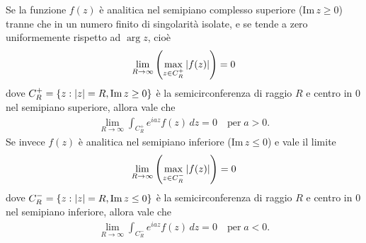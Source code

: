 \begin{lemma}[ di Jordan ]
  Se la funzione $ f(z) $ è analitica nel semipiano complesso superiore ($ \text{Im}\,z \geq 0 $) tranne che in un numero finito di singolarità isolate, 
  e se tende a zero uniformemente rispetto ad $ \arg z $, cioè 
  \begin{align}
    \lim_{R \to \infty} \left( \max_{z \in C^+_R} \left|{f(z)}\right|\right) = 0
  \end{align}
  dove $ C^+_R = \{z: \left|{z}\right| = R, \text{Im} \, z \geq 0\} $ è la semicirconferenza di raggio $ R $ e centro in $ 0 $ nel semipiano superiore, 
  allora vale che 
  \begin{align}
    \lim_{R \to \infty} \int_{C^+_R} e^{iaz} f(z) \,dz = 0 \quad \text{per} \; a > 0.
  \end{align}
  Se invece $ f(z) $ è analitica nel semipiano inferiore ($ \text{Im}\,z \leq 0 $) e vale il limite 
  \begin{align}
    \lim_{R \to \infty} \left( \max_{z \in C^-_R} \left|{f(z)}\right|\right) = 0
  \end{align}
  dove $ C^-_R = \{z: \left|{z}\right| = R, \text{Im} \, z \leq 0\} $ è la semicirconferenza di raggio $ R $ e centro in $ 0 $ nel semipiano inferiore, 
  allora vale che
  \begin{align}
    \lim_{R \to \infty} \int_{C^-_R} e^{iaz} f(z) \,dz = 0 \quad \text{per} \; a < 0.
  \end{align}
\end{lemma}
